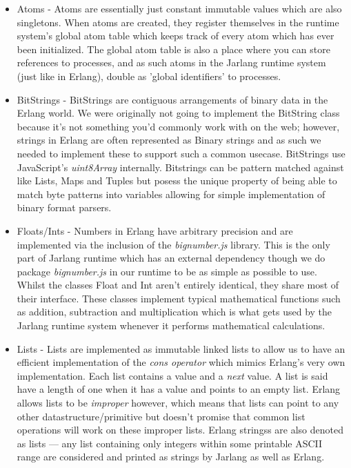 \documentclass[twoside,12pt,titlepage,a4paper]{article}
\begin{document}
\begin{itemize}
\item Atoms - Atoms are essentially just constant immutable values which are also singletons. When atoms are created, they register themselves in the runtime system's global atom table which keeps track of every atom which has ever been initialized. The global atom table is also a place where you can store references to processes, and as such atoms in the Jarlang runtime system (just like in Erlang), double as 'global identifiers' to processes.

\item BitStrings - BitStrings are contiguous arrangements of binary data in the Erlang world. We were originally not going to implement the BitString class because it's not something you'd commonly work with on the web; however, strings in Erlang are often represented as Binary strings and as such we needed to implement these to support such a common usecase. BitStrings use JavaScript's \textit{uint8Array} internally. Bitstrings can be pattern matched against like Lists, Maps and Tuples but posess the unique property of being able to match byte patterns into variables allowing for simple implementation of binary format parsers.

\item Floats/Ints - Numbers in Erlang have arbitrary precision and are implemented via the inclusion of the \textit{bignumber.js} library. This is the only part of Jarlang runtime which has an external dependency though we do package \textit{bignumber.js} in our runtime to be as simple as possible to use. Whilst the classes Float and Int aren't entirely identical, they share most of their interface. These classes implement typical mathematical functions such as addition, subtraction and multiplication which is what gets used by the Jarlang runtime system whenever it performs mathematical calculations.

\item Lists - Lists are implemented as immutable linked lists to allow us to have an efficient implementation of the \textit{cons operator} which mimics Erlang's very own implementation. Each list contains a value and a \textit{next} value. A list is said have a length of one when it has a value and points to an empty list. Erlang allows lists to be \textit{improper} however, which means that lists can point to any other datastructure/primitive but doesn't promise that common list operations will work on these improper lists. Erlang stringss are also denoted as lists --- any list containing only integers within some printable ASCII range are considered and printed as strings by Jarlang as well as Erlang.


\end{itemize}
\end{document}
